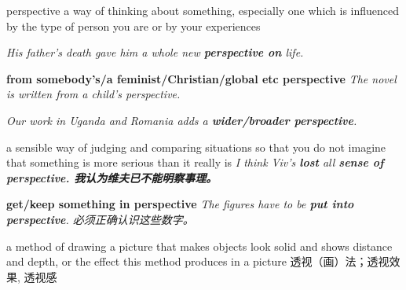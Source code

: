 \begin{DefWord}{perspective}
    a way of thinking about something, especially one which is influenced by the type of person you are or by your experiences

    \textit{His father's death gave him a whole new \textbf{perspective on} life.}
    
    \textbf{from somebody's/a feminist/Christian/global etc perspective}
    \textit{The novel is written from a child's perspective.}

    \textit{Our work in Uganda and Romania adds a \textbf{wider/broader perspective}.}

    a sensible way of judging and comparing situations so that you do not imagine that something is more serious than it really is
    \textit{I think Viv's \textbf{lost} all \textbf{sense of perspective. 我认为维夫已不能明察事理。 }}

    \textbf{get/keep something in perspective}
    \textit{The figures have to be \textbf{put into perspective}. 必须正确认识这些数字。 }

    a method of drawing a picture that makes objects look solid and shows distance and depth, or the effect this method produces in a picture 透视（画）法；透视效果, 透视感
\end{DefWord}

